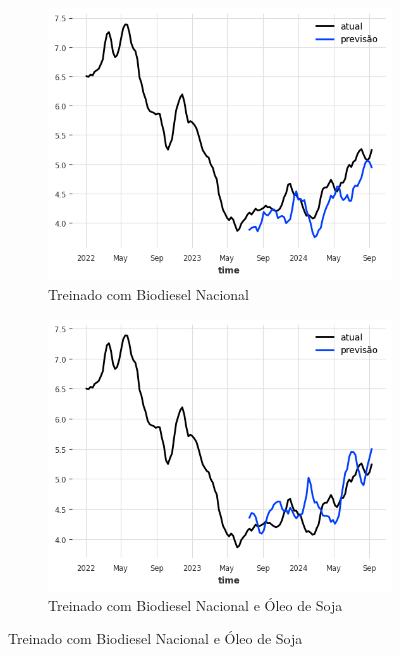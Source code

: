 \begin{figure}[htbp]
	\centering
	\begin{subfigure}[b]{0.45\textwidth}
		\centering
		\includegraphics[width=\textwidth]{figuras/imp_brasil_plot.png} %
		\caption{Treinado com Biodiesel Nacional \newline}
		\label{fig:imp_brasil_plot}
	\end{subfigure}
	\hfill
	\begin{subfigure}[b]{0.45\textwidth}
		\centering
		\includegraphics[width=\textwidth]{figuras/imp_brasil_oil_plot.png} %
		\caption{Treinado com Biodiesel Nacional e Óleo de Soja}
		\label{fig:imp_brasil_oil_plot}
	\end{subfigure}


\end{figure}
